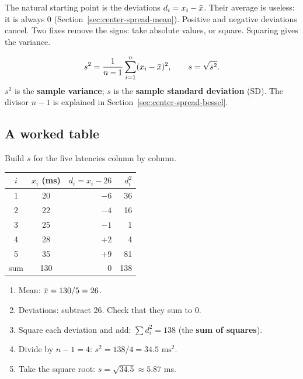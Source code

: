 The natural starting point is the deviations $d_i = x_i - \bar{x}$. Their average is
useless: it is always $0$ (Section~\ref{sec:center-spread-mean}). Positive and
negative deviations cancel. Two fixes remove the signs: take absolute values, or
square. Squaring gives the variance.

\begin{definition}
\[
  s^2 = \frac{1}{n-1}\sum_{i=1}^n (x_i - \bar{x})^2, \qquad s = \sqrt{s^2}.
\]
$s^2$ is the \textbf{sample variance}; $s$ is the \textbf{sample standard
deviation} (SD). The divisor $n-1$ is explained in
Section~\ref{sec:center-spread-bessel}.
\end{definition}

\subsection{A worked table}

Build $s$ for the five latencies column by column.

\begin{center}
\begin{tabular}{c c r r}
\toprule
$i$ & $x_i$ (ms) & $d_i = x_i - 26$ & $d_i^2$ \\
\midrule
1 & 20 & $-6$ & 36 \\
2 & 22 & $-4$ & 16 \\
3 & 25 & $-1$ & 1 \\
4 & 28 & $+2$ & 4 \\
5 & 35 & $+9$ & 81 \\
\midrule
sum & 130 & $0$ & 138 \\
\bottomrule
\end{tabular}
\end{center}

\begin{enumerate}
  \item Mean: $\bar{x} = 130/5 = 26$.
  \item Deviations: subtract 26. Check that they sum to $0$.
  \item Square each deviation and add: $\sum d_i^2 = 138$ (the \textbf{sum of
  squares}).
  \item Divide by $n-1 = 4$: $s^2 = 138/4 = 34.5 \text{ ms}^2$.
  \item Take the square root: $s = \sqrt{34.5} \approx 5.87$ ms.
\end{enumerate}

